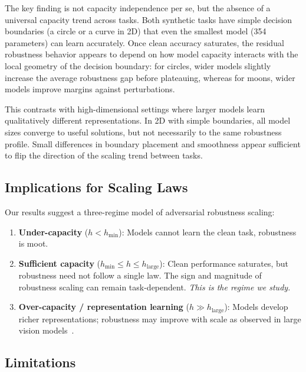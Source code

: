 \documentclass[11pt,a4paper]{article}
\begin{document}
The key finding is not capacity independence per se, but the absence of a universal
capacity trend across tasks.
Both synthetic tasks have simple decision boundaries (a circle or a curve in 2D)
that even the smallest model (354 parameters) can learn accurately.
Once clean accuracy saturates, the residual robustness behavior appears to depend on
how model capacity interacts with the local geometry of the decision boundary:
for circles, wider models slightly increase the average robustness gap before plateauing,
whereas for moons, wider models improve margins against perturbations.

This contrasts with high-dimensional settings where larger models learn qualitatively
different representations. In 2D with simple boundaries, all model sizes converge
to useful solutions, but not necessarily to the same robustness profile.
Small differences in boundary placement and smoothness appear sufficient to flip the
direction of the scaling trend between tasks.

\subsection{Implications for Scaling Laws}

Our results suggest a three-regime model of adversarial robustness scaling:
\begin{enumerate}
    \item \textbf{Under-capacity} ($h < h_{\min}$): Models cannot learn the clean task,
          robustness is moot.
    \item \textbf{Sufficient capacity} ($h_{\min} \leq h \leq h_{\text{large}}$):
          Clean performance saturates, but robustness need not follow a single law.
          The sign and magnitude of robustness scaling can remain task-dependent.
          \emph{This is the regime we study.}
    \item \textbf{Over-capacity / representation learning} ($h \gg h_{\text{large}}$):
          Models develop richer representations; robustness may improve with scale
          as observed in large vision models~\citep{bartoldson2024adversarial}.
\end{enumerate}

\subsection{Limitations}
\end{document}
